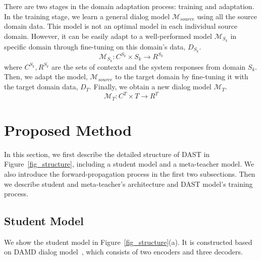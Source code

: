 \documentclass[letterpaper]{article} %
\begin{document}
There are two stages in the domain adaptation process: training and adaptation.
In the training stage, we learn a general dialog model $\mathcal{M}_{source}$ using all the source domain data. This model is not an optimal model in each individual source domain. However, it can be easily adapt to a well-performed model $\mathcal{M}_{S_k}$ in specific domain through fine-tuning on this domain's data, $D_{S_k}$.
$$\mathcal{M}_{S_k}:C^{S_k}\times S_k\rightarrow R^{S_k}$$
where $C^{S_k}, R^{S_k}$ are the sets of contexts and the system responses from domain $S_k$.
Then, we adapt the model, $\mathcal{M}_{source}$ to the target domain by fine-tuning it with the target domain data, $D_T$. Finally, we obtain a new dialog model $\mathcal{M}_{T}$. %
    $$\mathcal{M}_{T}:C^T\times T\rightarrow R^T$$




\section*{Proposed Method}
In this section, we first describe the detailed structure of DAST in Figure~\ref{fig_structure}, including a student model and a meta-teacher model. We also introduce the forward-propagation process in the first two subsections.
%
Then we describe student and meta-teacher's architecture and DAST model's training process.



\subsection*{Student Model}
We show the student model in Figure~\ref{fig_structure}(a). It is constructed based on DAMD dialog model~\citep{zhang2019task}, which consists of two encoders and three decoders.
    
\end{document}
